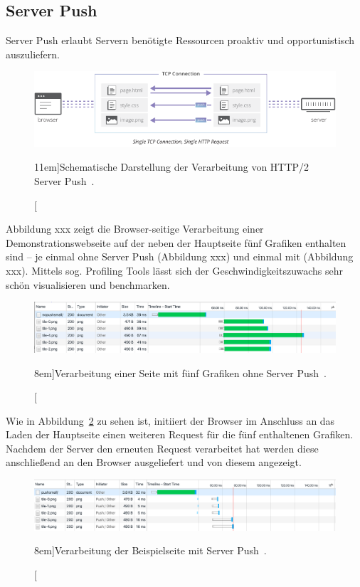 \documentclass[a4paper, justified, notoc]{tufte-handout} %
\begin{document}
\subsection{Server Push} %
\label{sub:server_push}

Server Push erlaubt Servern benötigte Ressourcen proaktiv und opportunistisch auszuliefern.  

\begin{figure}%
	\centering
  \includegraphics[width=1.55\textwidth]{./figures/http2_server_push.pdf}
  \caption[][11em]{Schematische Darstellung der Verarbeitung von HTTP/2 Server Push~\citep{vlad:2016}.}
  \label{fig:server_push_mit}
\end{figure}


Abbildung xxx zeigt die Browser-seitige Verarbeitung einer Demonstrationswebseite auf der neben der Hauptseite fünf Grafiken enthalten sind -- je einmal ohne Server Push (Abbildung xxx) und einmal mit (Abbildung xxx).
Mittels sog. Profiling Tools lässt sich der Geschwindigkeitszuwachs sehr schön visualisieren und benchmarken. 

\begin{figure}%
	\centering
  \includegraphics[width=1.55\textwidth]{./figures/server_push_ohne.png}
  \caption[][8em]{Verarbeitung einer Seite mit fünf Grafiken ohne Server Push~\citep{vlad:2016}.}
  \label{fig:server_push_ohne}
\end{figure}
Wie in Abbildung~\ref{fig:server_push_ohne} zu sehen ist, initiiert der Browser im Anschluss an das Laden der Hauptseite einen weiteren Request für die fünf enthaltenen Grafiken. Nachdem der Server den erneuten Request verarbeitet hat werden diese anschließend an den Browser ausgeliefert und von diesem angezeigt.

\begin{figure}%
	\centering
  \includegraphics[width=1.55\textwidth]{./figures/server_push_mit.png}
  \caption[][8em]{Verarbeitung der Beispielseite mit Server Push~\citep{vlad:2016}.}
  \label{fig:server_push_mit}
\end{figure}
\end{document}
